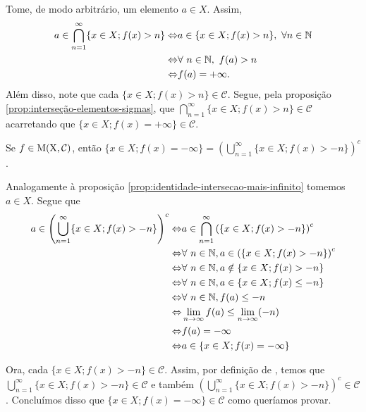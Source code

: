     \begin{prova}
        Tome, de modo arbitrário, um elemento $a \in X$. 
        Assim, 
        \begin{align*}
            a \in \bigcap_{n = 1}^\infty \{x \in X; f(x) > n\} 
            \Leftrightarrow & a \in \{x \in X; f(x) > n\}, \ \forall n \in \N\\
            \Leftrightarrow & \forall\ n \in \N,\ f(a) > n\\
            \Leftrightarrow & f(a) = +\infty.  
        \end{align*}
    Além disso, note que cada $\{x \in X; f(x) > n\} \in \mathcal{C}$.
    Segue, pela proposição \ref{prop:interseção-elementos-sigmas}, que \linebreak $\displaystyle \bigcap_{n = 1}^\infty \{x \in X; f(x) > n\} \in \mathcal{C}$ acarretando que $\{x \in X; f(x) = +\infty\} \in \mathcal{C}$. 
    \end{prova}

    \begin{proposition}
    \label{prop:identidade-união-menos-infinito}
        Se $f \in \operatorname{M(X, \mathcal{C} )}$, então $\{x \in X; f(x) = -\infty\} = \displaystyle \left(\bigcup_{n = 1}^\infty \{x \in X; f(x) > - n\}\right)^c$.
    \end{proposition}
    \begin{prova}
        Analogamente à proposição \ref{prop:identidade-intersecao-mais-infinito} tomemos $a \in X$. 
        Segue que 
        \begin{align*}
            a \in \left(\bigcup_{n = 1}^\infty \{x \in X; f(x) > - n\}\right)^c
            \Leftrightarrow & a \in \bigcap_{n = 1}^\infty \left(\{x \in X; f(x) > - n\}\right)^c\\
            \Leftrightarrow & \forall \ n \in \operatorname{\mathbb{N}}, a \in \left(\{x \in X; f(x) > - n\}\right)^c\\
            \Leftrightarrow & \forall \ n \in \operatorname{\mathbb{N}}, a \notin \{x \in X; f(x) > - n\}\\
            \Leftrightarrow & \forall \ n \in \operatorname{\mathbb{N}}, a \in \{x \in X; f(x) \leq - n\}\\
            \Leftrightarrow & \forall \ n \in \operatorname{\mathbb{N}}, f(a) \leq - n\\
            \Leftrightarrow & \lim_{n \to \infty} f(a) \leq \lim_{n \to \infty} (- n)\\                        
            \Leftrightarrow & f(a) = -\infty\\            
            \Leftrightarrow & a \in \{x \in X; f(x) = -\infty\}            
        \end{align*}
        
    Ora, cada $\{x \in X; f(x) > - n\} \in \mathcal{C}$.
    Assim, por definição de \sigal, temos que $ \displaystyle\bigcup_{n = 1}^\infty \{x \in X; f(x) > - n\} \in \mathcal{C}$ e também 
    $\displaystyle\left(\bigcup_{n = 1}^\infty \{x \in X; f(x) > - n\}\right)^c \in \mathcal{C}$.
    Concluímos disso que $\{x \in X; f(x) = -\infty\} \in \mathcal{C}$ como queríamos provar. 
    \end{prova}


